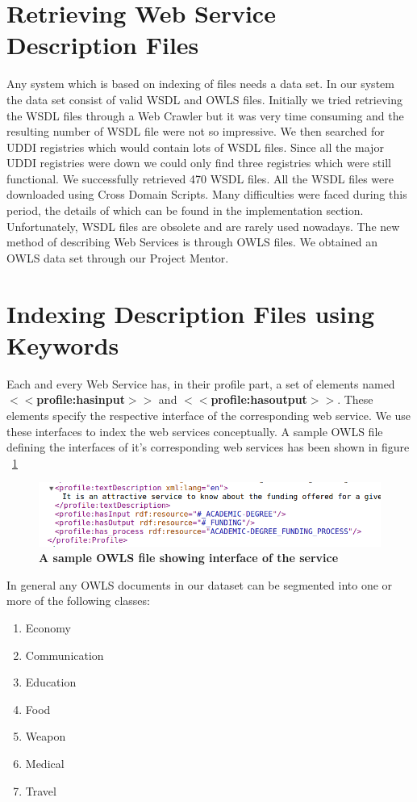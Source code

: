 \documentclass[12pt, oneside]{book}
\begin{document}
\section{Retrieving Web Service Description Files}
Any system which is based on indexing of files needs a data set. In our system the data set consist of valid WSDL and OWLS files. Initially we tried retrieving the WSDL files through a Web Crawler but it was very time consuming and the resulting number of WSDL file were not so impressive. We then searched for UDDI registries which would contain lots of WSDL files. Since all the major UDDI registries were down we could only find three registries which were still functional. We successfully retrieved 470 WSDL files. All the WSDL files were downloaded using Cross Domain Scripts. Many difficulties were faced during this period, the details of which can be found in the implementation section. Unfortunately, WSDL files are obsolete and are rarely used nowadays. The new method of describing Web Services is through OWLS files. We obtained an OWLS data set through our Project Mentor.

\section{Indexing Description Files using Keywords}
Each and every Web Service has, in their profile part, a set of elements named \textbf{$<<$profile:hasinput$>>$} and \textbf{$<<$profile:hasoutput$>>$}. These elements specify the respective interface of the corresponding web service. We use these interfaces to index the web services conceptually. A sample OWLS file defining the interfaces of it's corresponding web services has been shown in figure ~\ref{fig: owl}
\begin{figure}
 \centering
 \includegraphics[width=\textwidth]{pics/sample_owls.png}
 \caption{\textbf{A sample OWLS file showing interface of the service}}
 \label{fig: owl}
\end{figure}
\par
In general any OWLS documents in our dataset can be segmented into one or more of the following classes:
\begin{enumerate}
 \item Economy
 \item Communication
 \item Education
 \item Food
 \item Weapon
 \item Medical
 \item Travel
\end{enumerate}
\end{document}
